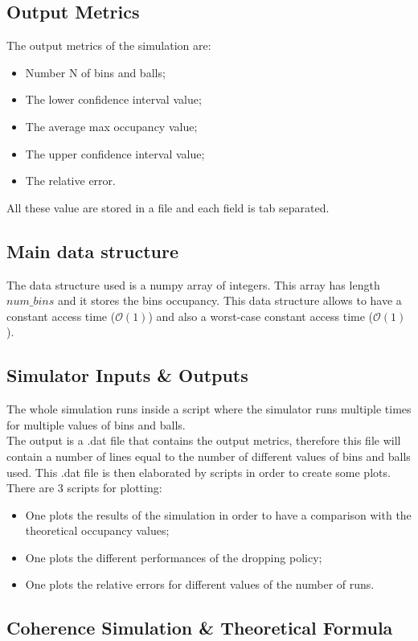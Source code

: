 \documentclass[twocolumn,letterpaper]{report}
\begin{document}
{	\subsection{Output Metrics}
			The output metrics of the simulation are:
			\begin{itemize}
				\item Number N of bins and balls;
				\item The lower confidence interval value;
				\item The average max occupancy value;
				\item The upper confidence interval value;
				\item The relative error.
			\end{itemize}
			All these value are stored in a file and each field is tab separated.
	
	\subsection{Main data structure}
			The data structure used is a numpy array of integers. This array has length $num\_bins$ and it stores the bins occupancy. This data structure allows to have a constant access time ($\mathcal{O}(1)$) and also a worst-case constant access time ($\mathcal{O}(1)$).
			
	\subsection{Simulator Inputs \& Outputs}
			The whole simulation runs inside a script where the simulator runs multiple times for multiple values of bins and balls. \\
			The output is a .dat file that contains the output metrics, therefore this file will contain a number of lines equal to the number of different values of bins and balls used. This .dat file is then elaborated by scripts in order to create some plots. There are 3 scripts for plotting:
			\begin{itemize}
				\item One plots the results of the simulation in order to have a comparison with the theoretical occupancy values;
				\item One plots the different performances of the dropping policy;
				\item One plots the relative errors for different values of the number of runs.
			\end{itemize}
			
			\subsection{Coherence Simulation \& Theoretical Formula}
			
}
\end{document}
